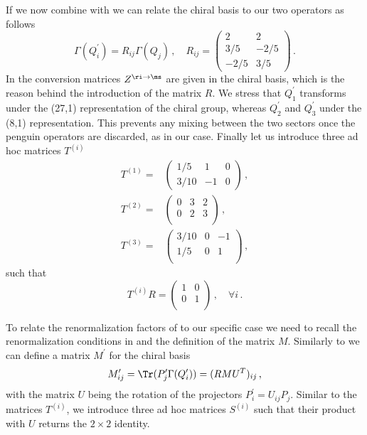 \documentclass[aps,prd,twocolumn,nofootinbib,showpacs,superscriptaddress]{revtex4-1}
\begin{document}
If we now combine  with  we can relate the chiral
basis to our two operators as follows
\begin{equation}
\Gamma(Q_i^\prime) = R_{ij} \Gamma(Q_j) \,,  \quad 
R_{ij} = \begin{pmatrix}
2 & 2 \\
3/5 & -2/5 \\
-2/5 & 3/5
\end{pmatrix} \,.
\end{equation}
In  the conversion matrices $Z^{\ri \to \ms}$ 
are given in the chiral basis, which is the reason behind 
the introduction of the matrix $R$.
We stress that $Q_1^\prime$ transforms under the (27,1) representation
of the chiral group, whereas $Q_2^\prime$ and $Q_3^\prime$ under
the (8,1) representation. This prevents any mixing between the two sectors
once the penguin operators are discarded, as in our case.
Finally let us introduce three ad hoc matrices $T^{(i)}$ 
\begin{equation}
\begin{split}
T^{(1)} = & \begin{pmatrix}
1/5 & 1 & 0 \\
3/10 & -1 & 0
\end{pmatrix} \,, \\
T^{(2)} = & \begin{pmatrix}
0 & 3 & 2 \\
0 & 2 & 3 \\
\end{pmatrix} \,, \\
T^{(3)} = & \begin{pmatrix}
 3/10 & 0 & -1 \\
  1/5 & 0 & 1 \\
\end{pmatrix} \,,
\end{split}
\end{equation}
such that
\begin{equation}
  T^{(i)} R = \begin{pmatrix}
  1 & 0 \\
  0 & 1 \\
\end{pmatrix} \,, \quad
\forall i \,.
\end{equation}

To relate the renormalization factors of  to 
our specific case we need to recall the renormalization conditions 
in  and the definition of the matrix $M$. Similarly to  
we can define a matrix $M^\prime$ for the chiral basis
\begin{equation}
M^\prime_{ij} = \Tr( P^\prime_j \Gamma(Q^\prime_i) ) = 
(R M U^T)_{ij} \,,
\label{eq:Mprime}
\end{equation}
with the matrix $U$ being the rotation of the projectors $P^\prime_i = U_{ij} P_j$.
Similar to the matrices $T^{(i)}$, we introduce three ad hoc matrices $S^{(i)}$ such that
their product with $U$ returns the $2\times 2$ identity.
\end{document}
